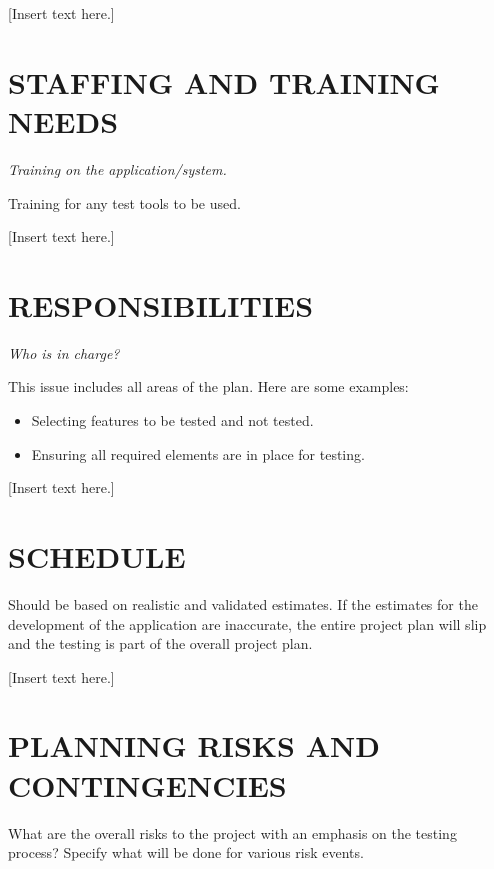 {{}
{\color{black}
[Insert text here.]}

\section[STAFFING AND TRAINING NEEDS]{\bfseries\color{black}
	 STAFFING AND TRAINING NEEDS}
{\itshape\color{black}
Training on the application/system.

Training for any test tools to be used. 
}
{\color{black}
[Insert text here.]}

\section[RESPONSIBILITIES]{\bfseries\color{black} RESPONSIBILITIES}
{\itshape\color{black}
Who is in charge?

This issue includes all areas of the plan. Here are some examples:

\begin{itemize}
\item Selecting features to be tested and not tested.
\item Ensuring all required elements are in place for testing. 
\end{itemize}
}
{\color{black}
[Insert text here.]}

\section[SCHEDULE]{\bfseries\color{black} SCHEDULE}
{\itshape\color{black}

Should be based on realistic and validated estimates. If the estimates
for the development of the application are inaccurate, the entire
project plan will slip and the testing is part of the overall project plan.

}
{\color{black}
[Insert text here.]}

\section[PLANNING RISKS AND CONTINGENCIES]{\bfseries\color{black}
	 PLANNING RISKS AND CONTINGENCIES}
{\itshape\color{black}

What are the overall risks to the project with an emphasis on the
testing process? Specify what will be done for various risk events.

}}

